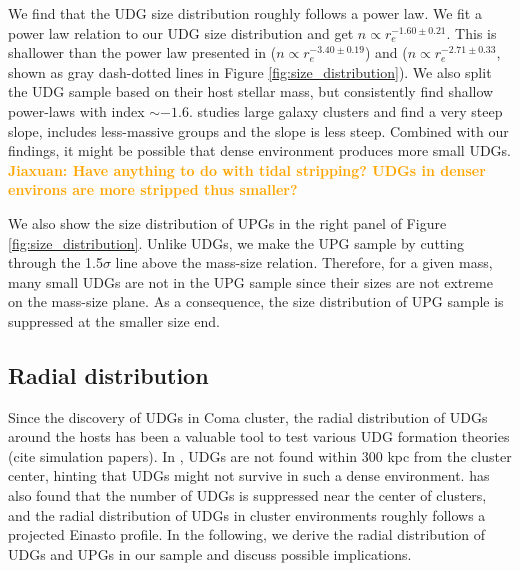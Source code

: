 \documentclass[twocolumn,astrosymb,twocolappendix]{aastex631}
\newcommand{\jiaxuan}[1]{\textcolor{orange}{\textbf{Jiaxuan: #1}}}
\begin{document}
\begin{CJK*}{UTF8}{gbsn}
We find that the UDG size distribution roughly follows a power law. We fit a power law relation to our UDG size distribution and get $n\propto r_e^{-1.60\pm0.21}$. This is shallower than the power law presented in \citet{vdBurg2016} ($n\propto r_e^{-3.40\pm0.19}$) and \citet{vdBurg2017} ($n\propto r_e^{-2.71\pm0.33}$, shown as gray dash-dotted lines in Figure \ref{fig:size_distribution}). We also split the UDG sample based on their host stellar mass, but consistently find shallow power-laws with index $\sim -1.6$. \citet{vdBurg2016} studies large galaxy clusters and find a very steep slope, \citet{vdBurg2017} includes less-massive groups and the slope is less steep. Combined with our findings, it might be possible that dense environment produces more small UDGs. \jiaxuan{Have anything to do with tidal stripping? UDGs in denser environs are more stripped thus smaller?}

We also show the size distribution of UPGs in the right panel of Figure \ref{fig:size_distribution}. Unlike UDGs, we make the UPG sample by cutting through the 1.5$\sigma$ line above the mass-size relation. Therefore, for a given mass, many small UDGs are not in the UPG sample since their sizes are not extreme on the mass-size plane. As a consequence, the size distribution of UPG sample is suppressed at the smaller size end. 

\subsection{Radial distribution}\label{sec:radial_distr}
Since the discovery of UDGs in Coma cluster, the radial distribution of UDGs around the hosts has been a valuable tool to test various UDG formation theories (cite simulation papers). In \citet{vanDokkum2015}, UDGs are not found within 300 kpc from the cluster center, hinting that UDGs might not survive in such a dense environment. \citet{vdBurg2016} has also found that the number of UDGs is suppressed near the center of clusters, and the radial distribution of UDGs in cluster environments roughly follows a projected Einasto \citep{Einasto1965} profile. In the following, we derive the radial distribution of UDGs and UPGs in our sample and discuss possible implications.


\end{CJK*}
\end{document}
